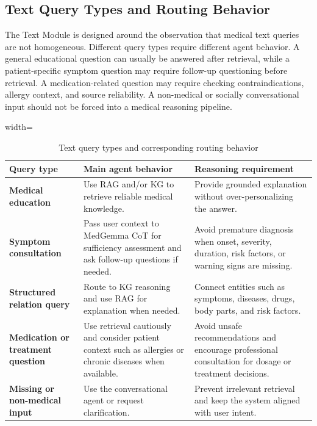 \subsection{Text Query Types and Routing Behavior}

The Text Module is designed around the observation that medical text queries are not homogeneous. Different query types require different agent behavior. A general educational question can usually be answered after retrieval, while a patient-specific symptom question may require follow-up questioning before retrieval. A medication-related question may require checking contraindications, allergy context, and source reliability. A non-medical or socially conversational input should not be forced into a medical reasoning pipeline.

\begin{table}[H]
\centering
\begin{adjustbox}{width=\textwidth}
\begin{tabular}{>{\RaggedRight\arraybackslash}p{} >{\RaggedRight\arraybackslash}p{} >{\RaggedRight\arraybackslash}p{}}
\hline\hline
\textbf{Query type} & \textbf{Main agent behavior} & \textbf{Reasoning requirement} \\
\hline
\textbf{Medical education} & Use RAG and/or KG to retrieve reliable medical knowledge. & Provide grounded explanation without over-personalizing the answer. \\
\textbf{Symptom consultation} & Pass user context to MedGemma CoT for sufficiency assessment and ask follow-up questions if needed. & Avoid premature diagnosis when onset, severity, duration, risk factors, or warning signs are missing. \\
\textbf{Structured relation query} & Route to KG reasoning and use RAG for explanation when needed. & Connect entities such as symptoms, diseases, drugs, body parts, and risk factors. \\
\textbf{Medication or treatment question} & Use retrieval cautiously and consider patient context such as allergies or chronic diseases when available. & Avoid unsafe recommendations and encourage professional consultation for dosage or treatment decisions. \\
\textbf{Missing or non-medical input} & Use the conversational agent or request clarification. & Prevent irrelevant retrieval and keep the system aligned with user intent. \\
\hline\hline
\end{tabular}
\end{adjustbox}
\caption{Text query types and corresponding routing behavior}
\label{table:text-query-routing}
\end{table}

